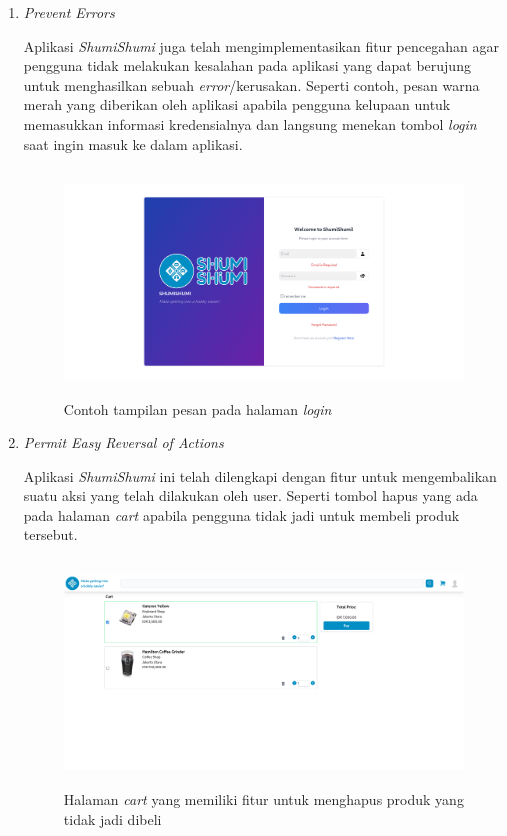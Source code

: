 \documentclass[a4paper]{article}
\begin{document}
\begin{enumerate}
\begin{enumerate}
        \item \textit{Prevent Errors}
        
        Aplikasi \textit{ShumiShumi} juga telah mengimplementasikan fitur pencegahan agar pengguna tidak melakukan kesalahan pada aplikasi yang dapat berujung untuk menghasilkan sebuah \textit{error}/kerusakan. Seperti contoh, pesan warna merah yang diberikan oleh aplikasi apabila pengguna kelupaan untuk memasukkan informasi kredensialnya dan langsung menekan tombol \textit{login} saat ingin masuk ke dalam aplikasi.

        \begin{figure}[h]
            \centering
            \includegraphics*[height=6cm]{images/prosedur pengunaan aplikasi/login.png}
            \caption{Contoh tampilan pesan pada halaman \textit{login}}
        \end{figure}
        \newpage
        \item \textit{Permit Easy Reversal of Actions}
        
        Aplikasi  \textit{ShumiShumi} ini telah dilengkapi dengan fitur untuk mengembalikan suatu aksi yang telah dilakukan oleh user. Seperti tombol hapus yang ada pada halaman \textit{cart} apabila pengguna tidak jadi untuk membeli produk tersebut. 

        \begin{figure}[h]
            \centering
            \includegraphics*[height=6cm]{images/prosedur pengunaan aplikasi/Cart.png}
            \caption{Halaman \textit{cart} yang memiliki fitur untuk menghapus produk yang tidak jadi dibeli}
        \end{figure}


\end{enumerate}
\end{enumerate}
\end{document}
